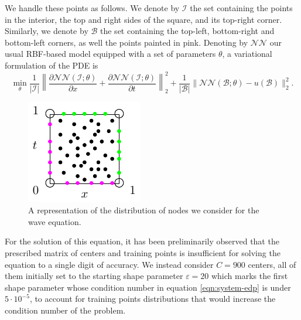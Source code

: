 \documentclass[12pt]{report} %
\begin{document}
We handle these points as follows. We denote by $\mathcal{I}$ the set containing the points in the interior, the top and right sides of the square, and its top-right corner. Similarly, we denote by $\mathcal{B}$ the set containing the top-left, bottom-right and bottom-left corners, as well the points painted in pink. Denoting by $\mathcal{NN}$ our usual RBF-based model equipped with a set of parameters $\theta$, a variational formulation of the PDE is 
\[ \min_{\theta} \frac{1}{| \mathcal{I} |} \left\| \frac{\partial
   \mathcal{N}\mathcal{N} (\mathcal{I}; \theta)}{\partial x} + \frac{\partial
   \mathcal{N}\mathcal{N} (\mathcal{I}; \theta)}{\partial t} \right\|_2^2 +
   \frac{1}{| \mathcal{B} |} \| \mathcal{N}\mathcal{N} (\mathcal{B}; \theta) -
   u (\mathcal{B}) \|_2^2 . \]

\begin{figure}
  \includegraphics[width=.3\textwidth]{cool_graphics/cuadrado-dominio-edp-onda.pdf}
  \caption{A representation of the distribution of nodes we consider for the wave equation.}
  \label{fig:representation-domain-problem-wave}
\end{figure}

For the solution of this equation, it has been preliminarily observed that the prescribed matrix of centers and training points is insufficient for solving the equation to a single digit of accuracy. We instead consider $C=900$ centers, all of them initially set to the starting shape parameter $\varepsilon=20$ which marks the first shape parameter whose condition number in equation \eqref{eqn:system-edp} is under $5\cdot 10^{-5}$, to account for training points distributions that would increase the condition number of the problem. %

\end{document}
